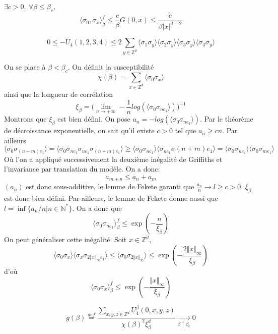 \documentclass[a4paper,12pt]{report}
\begin{document}
\begin{thm}
$\exists c > 0, \ \forall \beta \leq \beta_c,$
$$
\langle \sigma_0, \sigma_x \rangle^f_{\beta} \leq \frac{c}{\beta} G(0,x) \leq \frac{\tilde{c}}{\beta \vert x \vert^{d-2}}
$$
\end{thm}

\begin{prop}
$$
0 \leq - U_4(1,2,3,4) \leq 2 \sum_{y \in \mathbb{Z}^d} \langle \sigma_1 \sigma_y \rangle \langle \sigma_2 \sigma_y \rangle \langle \sigma_3 \sigma_y \rangle \langle \sigma_4 \sigma_y \rangle
$$
\end{prop}

On se place à $\beta < \beta_c$. On définit la susceptibilité
$$
\chi(\beta) = \sum_{x \in \mathbb{Z}^d} \langle \sigma_0 \sigma_x \rangle
$$
ainsi que la longueur de corrélation
$$
\xi_{\beta} = \big( \lim_{n \rightarrow + \infty} - \frac{1}{n} log( \langle \sigma_0 \sigma_{n e_1} \rangle ) \big)^{-1}
$$
Montrons que $\xi_{\beta}$ est bien défini. On pose $a_n = - log( \langle \sigma_0 \sigma_{n e_1} \rangle )$. Par le théorème de décroissance exponentielle, on sait qu'il existe $c>0$ tel que $a_n \geq c n$. Par ailleurs
$$
\langle \sigma_0 \sigma_{(n+m)e_1} \rangle = \langle \sigma_0 \sigma_{ne_1} \sigma_{ne_1} \sigma_{(n+m)e_1} \rangle 
\geq \langle \sigma_0 \sigma_{ne_1} \rangle \langle \sigma_{ne_1} \sigma{(n+m)e_1} \rangle 
= \langle \sigma_0 \sigma_{ne_1} \rangle \langle \sigma_0 \sigma_{me_1} \rangle
$$
Où l'on a appliqué successivement la deuxième inégalité de Griffiths et l'invariance par translation du modèle. On a donc:
$$
a_{m+n} \leq a_n + a_m
$$
$(a_n)$ est donc sous-additive, le lemme de Fekete garanti que $\frac{a_n}{n} \rightarrow l \geq c > 0$. $\xi_{\beta}$ est donc bien défini. Par ailleurs, le lemme de Fekete donne aussi que $l = \inf \{ a_n / n \vert n \in \mathbb{N}^* \}$. On a donc que
$$
\langle \sigma_0 \sigma_{ne_1} \rangle_{\beta}^f \leq \exp(- \frac{n}{\xi_{\beta}})
$$
On peut généraliser cette inégalité. Soit $x \in \mathbb{Z}^d$,
$$
\langle \sigma_0 \sigma_x \rangle \langle \sigma_x \sigma_{2 \Vert x \Vert_{\infty} e_1} \rangle \leq \langle \sigma_0 \sigma_{2 \Vert x \Vert_{\infty}} \rangle \leq \exp(-\frac{2 \Vert x \Vert_{\infty}}{\xi_{\beta}})
$$
d'où
$$
\langle \sigma_0 \sigma_x \rangle_{\beta}^f \leq \exp(-\frac{\Vert x \Vert_{\infty}}{\xi_{\beta}})
$$

\begin{thm}
$$
g(\beta) \overset{def}{=} \frac{\sum_{x,y,z \in \mathbb{Z}^d} U_4^{\beta}(0,x,y,z)}{\chi(\beta)^2 \xi_{\beta}^d} \xrightarrow[\beta \uparrow \beta_c]{} 0
$$
\end{thm}
\end{document}
